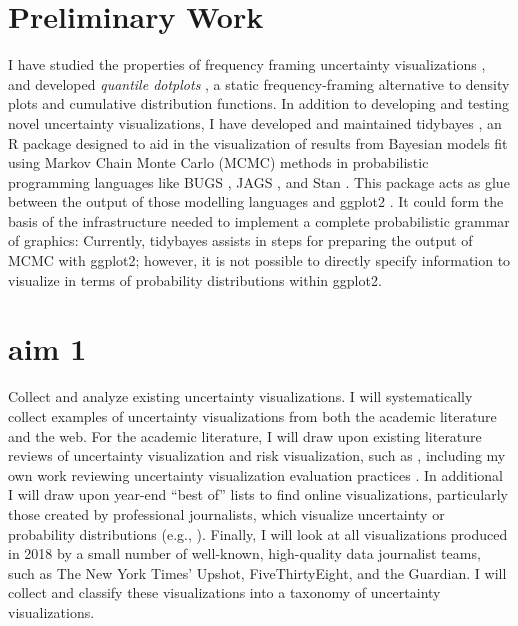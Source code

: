 \documentclass[11pt]{article}
\begin{document}
\section{Preliminary Work}

I have studied the properties of frequency framing uncertainty visualizations \cite{kale2018hypothetical,hullman2018imagining,hullman2018pursuit,kay2016bus,Fernandes2018}, and developed \emph{quantile dotplots} \cite{kay2016bus,Fernandes2018}, a static frequency-framing alternative to density plots and cumulative distribution functions. In addition to developing and testing novel uncertainty visualizations, I have developed and maintained tidybayes \cite{kay2017tidybayes}, an R package designed to aid in the visualization of results from Bayesian models fit using Markov Chain Monte Carlo (MCMC) methods in probabilistic programming languages like BUGS \cite{lunn2009bugs, lunn2000winbugs}, JAGS \cite{plummer2003jags}, and Stan \cite{carpenter2017stan}. This package acts as glue between the output of those modelling languages and ggplot2 \cite{wickham2016ggplot2}. It could form the basis of the infrastructure needed to implement a complete probabilistic grammar of graphics: Currently, tidybayes assists in steps for preparing the output of MCMC with ggplot2; however, it is not possible to directly specify information to visualize in terms of probability distributions within ggplot2. 





\section{aim 1}

Collect and analyze existing uncertainty visualizations. I will systematically collect examples of uncertainty visualizations from both the academic literature and the web. For the academic literature, I will draw upon existing literature reviews of uncertainty visualization and risk visualization, such as 
\cite{MacEachren1992,Ancker2006,Garcia-Retamero2013,maceachren_visualizing_2005}
, including my own work reviewing uncertainty visualization evaluation practices \cite{hullman2018pursuit}. In additional I will draw upon year-end ``best of'' lists to find online visualizations, particularly those created by professional journalists, which visualize uncertainty or probability distributions (e.g., \cite{noauthor_forecasting_nodate}). 
Finally, I will look at all visualizations produced in 2018 by a small number of well-known, high-quality data journalist teams, such as The New York Times’ Upshot, FiveThirtyEight, and the Guardian. I will collect and classify these visualizations into a taxonomy of uncertainty visualizations.
\end{document}
